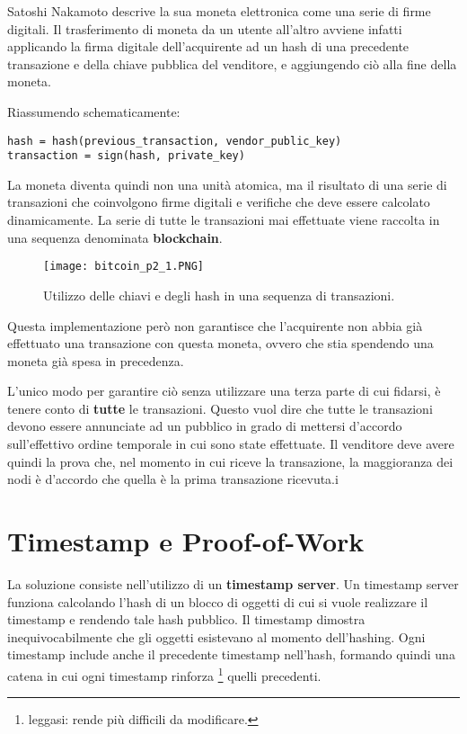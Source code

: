 Satoshi Nakamoto descrive la sua moneta elettronica come una serie di
firme digitali. Il trasferimento di moneta da un utente all'altro
avviene infatti applicando la firma digitale dell'acquirente ad un hash
di una precedente transazione e della chiave pubblica del venditore, e
aggiungendo ciò alla fine della moneta.

Riassumendo schematicamente:

\begin{verbatim}
hash = hash(previous_transaction, vendor_public_key)
transaction = sign(hash, private_key)
\end{verbatim}

La moneta diventa quindi non una unità atomica, ma il risultato di una
serie di transazioni che coinvolgono firme digitali e verifiche che deve
essere calcolato dinamicamente. La serie di tutte le transazioni mai
effettuate viene raccolta in una sequenza denominata
\textbf{blockchain}.

\begin{figure}[htbp]
\centering
\texttt{[image: bitcoin\_p2\_1.PNG]}
\caption{Utilizzo delle chiavi e degli hash in una sequenza di
transazioni.\label{bitcoin_p2_1}}
\end{figure}

Questa implementazione però non garantisce che l'acquirente non abbia
già effettuato una transazione con questa moneta, ovvero che stia
spendendo una moneta già spesa in precedenza.

L'unico modo per garantire ciò senza utilizzare una terza parte di cui
fidarsi, è tenere conto di \textbf{tutte} le transazioni. Questo vuol
dire che tutte le transazioni devono essere annunciate ad un pubblico in
grado di mettersi d'accordo sull'effettivo ordine temporale in cui sono
state effettuate. Il venditore deve avere quindi la prova che, nel
momento in cui riceve la transazione, la maggioranza dei nodi è
d'accordo che quella è la prima transazione ricevuta.i

\section{Timestamp e Proof-of-Work}\label{timestamp-e-proof-of-work}

La soluzione consiste nell'utilizzo di un \textbf{timestamp server}. Un
timestamp server funziona calcolando l'hash di un blocco di oggetti di
cui si vuole realizzare il timestamp e rendendo tale hash pubblico. Il
timestamp dimostra inequivocabilmente che gli oggetti esistevano al
momento dell'hashing. Ogni timestamp include anche il precedente
timestamp nell'hash, formando quindi una catena in cui ogni timestamp
rinforza \footnote{leggasi: rende più difficili da modificare.} quelli
precedenti.

